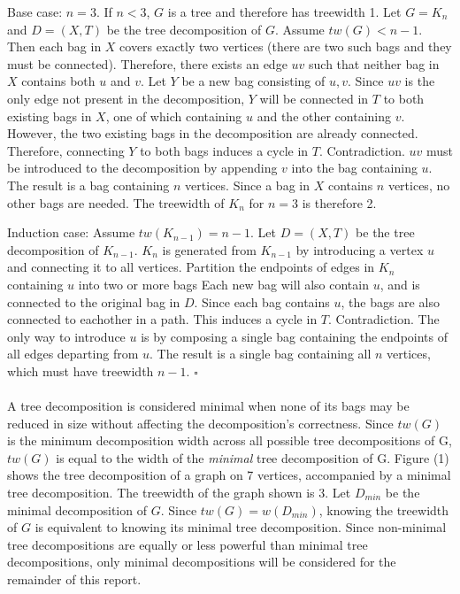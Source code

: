 \documentclass[12pt,conference]{IEEEtran}
\theoremstyle{plain}
\begin{document}
Base case: $n=3$. If $n<3$, $G$ is a tree and therefore has treewidth 1. Let $G=K_{n}$ and $D=(X,T)$ be the tree decomposition of $G$. Assume $tw(G) < n-1$. Then each bag in $X$ covers exactly two vertices (there are two such bags and they must be connected). Therefore, there exists an edge $uv$ such that neither bag in $X$ contains both $u$ and $v$. Let $Y$ be a new bag consisting of $u,v$. Since $uv$ is the only edge not present in the decomposition, $Y$ will be connected in $T$ to both existing bags in $X$, one of which containing $u$ and the other containing $v$. However, the two existing bags in the decomposition are already connected. Therefore, connecting $Y$ to both bags induces a cycle in $T$. Contradiction. $uv$ must be introduced to the decomposition by appending $v$ into the bag containing $u$. The result is a bag containing $n$ vertices. Since a bag in $X$ contains $n$ vertices, no other bags are needed. The treewidth of $K_{n}$ for $n=3$ is therefore 2.

Induction case: Assume $tw(K_{n-1}) = n-1$. Let $D=(X,T)$ be the tree decomposition of $K_{n-1}$. $K_{n}$ is generated from $K_{n-1}$ by introducing a vertex $u$ and connecting it to all vertices. Partition the endpoints of edges in $K_{n}$ containing $u$ into two or more bags Each new bag will also contain $u$, and is connected to the original bag in $D$. Since each bag contains $u$, the bags are also connected to eachother in a path. This induces a cycle in $T$. Contradiction. The only way to introduce $u$ is by composing a single bag containing the endpoints of all edges departing from $u$. The result is a single bag containing all $n$ vertices, which must have treewidth $n-1$. $\square$
\\
\\
A tree decomposition is considered minimal when none of its bags may be reduced in size without affecting the decomposition's correctness. Since $tw(G)$ is the minimum decomposition width across all possible tree decompositions of G, $tw(G)$ is equal to the width of the \textit{minimal} tree decomposition of G. Figure (1) shows the tree decomposition of a graph on 7 vertices, accompanied by a minimal tree decomposition. The treewidth of the graph shown is 3. Let $D_{min}$ be the minimal decomposition of $G$. Since $tw(G) = w(D_{min})$, knowing the treewidth of $G$ is equivalent to knowing its minimal tree decomposition. Since non-minimal tree decompositions are equally or less powerful than minimal tree decompositions, only minimal decompositions will be considered for the remainder of this report.
\end{document}
